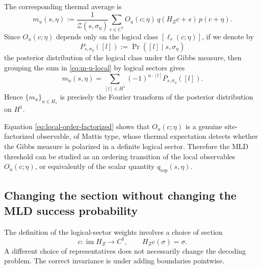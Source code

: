 \documentclass[twoside,english,aps,showpacs,pra,superscriptaddress]{revtex4-2}
\DeclareMathOperator{\im}{im}
\begin{document}
The corresponding thermal average is
\begin{equation}\label{eq:m-u-local}
    m_u(s,\eta)
    :=\frac{1}{\mathcal Z(s,\sigma_\eta)}
    \sum_{c\in C^1}
    O_u(c;\eta)\,q(H_Zc+s)\,p(c+\eta).
\end{equation}
Since \(O_u(c;\eta)\) depends only on the logical class \([\ell_r(c;\eta)]\), if we denote by
\begin{equation}\label{eq:sector-posterior-local}
    P_{s,\sigma_\eta}([l])
    :=\Pr([l]\mid s,\sigma_\eta)
\end{equation}
the posterior distribution of the logical class under the Gibbs measure, then grouping the sum in \eqref{eq:m-u-local} by logical sectors gives
\begin{equation}\label{eq:m-u-fourier}
    m_u(s,\eta)
    =\sum_{[l]\in H^1} (-1)^{u\cdot [l]} P_{s,\sigma_\eta}([l]).
\end{equation}
Hence \(\{m_u\}_{u\in H_1}\) is precisely the Fourier transform of the posterior distribution on \(H^1\).


Equation \eqref{eq:local-order-factorized} shows that \(O_u(c;\eta)\) is a genuine site-factorized observable, of Mattis type, whose thermal expectation detects whether the Gibbs measure is polarized in a definite logical sector. Therefore the MLD threshold can be studied as an ordering transition of the local observables \(O_u(c;\eta)\), or equivalently of the scalar quantity \(q_{\mathrm{top}}(s,\eta)\).

\subsection{Changing the section without changing the MLD success probability}

The definition of the logical-sector weights involves a choice of section
\begin{equation}\label{eq:section-c-def}
    c:\im H_Z\to C^1,
    \qquad
    H_Z c(\sigma)=\sigma .
\end{equation}
A different choice of representatives does not necessarily change the decoding problem. 
The correct invariance is under adding boundaries pointwise.
\end{document}
